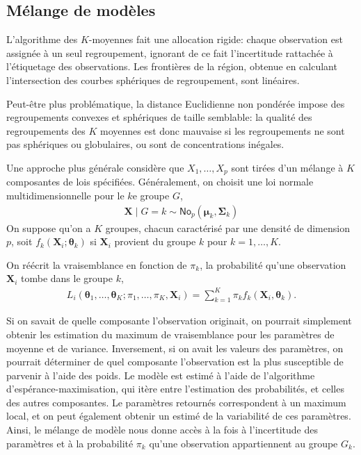 \documentclass[
  11pt,
  letterpaper,
]{scrbook}
\theoremstyle{definition}
\theoremstyle{remark}
\begin{document}
\hypertarget{muxe9lange-de-moduxe8les}{%
\subsection{Mélange de modèles}\label{muxe9lange-de-moduxe8les}}

L'algorithme des \(K\)-moyennes fait une allocation rigide: chaque
observation est assignée à un seul regroupement, ignorant de ce fait
l'incertitude rattachée à l'étiquetage des observations. Les frontières
de la région, obtenue en calculant l'intersection des courbes sphériques
de regroupement, sont linéaires.

Peut-être plus problématique, la distance Euclidienne non pondérée
impose des regroupements convexes et sphériques de taille semblable: la
qualité des regroupements des \(K\) moyennes est donc mauvaise si les
regroupements ne sont pas sphériques ou globulaires, ou sont de
concentrations inégales.

Une approche plus générale considère que \(X_1, \ldots, X_p\) sont
tirées d'un mélange à \(K\) composantes de lois spécifiées.
Généralement, on choisit une loi normale multidimensionnelle pour le
\(k\)e groupe \(G\), \begin{align*}
\boldsymbol{X} \mid G=k \sim \mathsf{No}_p(\boldsymbol{\mu}_k, \boldsymbol{\Sigma}_k)
\end{align*} On suppose qu'on a \(K\) groupes, chacun caractérisé par
une densité de dimension \(p\), soit
\(f_k(\boldsymbol{X}_i;\boldsymbol{\theta}_k)\) si \(\boldsymbol{X}_i\)
provient du groupe \(k\) pour \(k=1, \ldots, K\).

On réécrit la vraisemblance en fonction de \(\pi_k\), la probabilité
qu'une observation \(\mathbf{X}_i\) tombe dans le groupe \(k\),
\begin{align*}
 L_i(\boldsymbol{\theta}_1, \ldots, \boldsymbol{\theta}_K; \pi_1, \ldots, \pi_K, \mathbf{X}_i)= \sum_{k=1}^K\pi_k
f_{k}(\boldsymbol{X}_i,
\boldsymbol{\theta}_{k}).
\end{align*}

Si on savait de quelle composante l'observation originait, on pourrait
simplement obtenir les estimation du maximum de vraisemblance pour les
paramètres de moyenne et de variance. Inversement, si on avait les
valeurs des paramètres, on pourrait déterminer de quel composante
l'observation est la plus susceptible de parvenir à l'aide des poids. Le
modèle est estimé à l'aide de l'algorithme d'espérance-maximisation, qui
itère entre l'estimation des probabilités, et celles des autres
composantes. Le paramètres retournés correspondent à un maximum local,
et on peut également obtenir un estimé de la variabilité de ces
paramètres. Ainsi, le mélange de modèle nous donne accès à la fois à
l'incertitude des paramètres et à la probabilité \(\pi_k\) qu'une
observation appartiennent au groupe \(G_k\).
\end{document}
